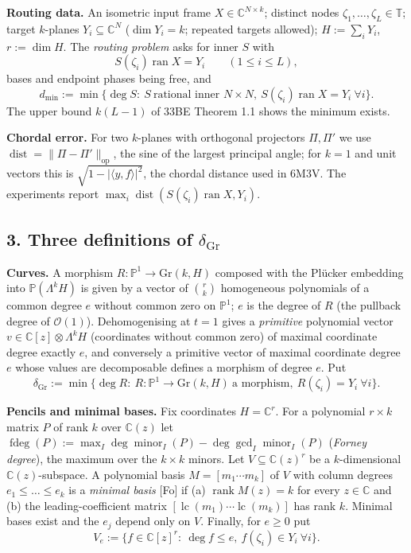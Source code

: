 \documentclass[
  11pt,
  a4paper,
]{article}
\begin{document}
\textbf{Routing data.} An isometric input frame
\(X\in\mathbb C^{N\times k}\); distinct nodes
\(\zeta_1,\allowbreak{}\dots,\allowbreak{}\zeta_L\in\mathbb T\); target \(k\)-planes
\(Y_i\subseteq\mathbb C^N\) (\(\dim Y_i=k\); repeated targets allowed);
\(H:=\sum_iY_i\), \(r:=\dim H\). The \emph{routing problem} asks for
inner \(S\) with
\[S(\zeta_i)\operatorname{ran}X=Y_i\qquad(1\le i\le L),\] bases and
endpoint phases being free, and
\[d_{\min}:=\min\{\deg S:\ S\ \text{rational inner } N\times N,\ S(\zeta_i)\operatorname{ran}X=Y_i\ \forall i\}.\]
The upper bound \(k(L-1)\) of 33BE Theorem 1.1 shows the minimum exists.

\textbf{Chordal error.} For two \(k\)-planes with orthogonal projectors
\(\Pi,\allowbreak{}\Pi'\) we use \(\operatorname{dist}=\|\Pi-\Pi'\|_{\mathrm{op}}\),
the sine of the largest principal angle; for \(k=1\) and unit vectors
this is \(\sqrt{1-|\langle y,\allowbreak{}f\rangle|^2}\), the chordal distance used
in 6M3V. The experiments report
\(\max_i\operatorname{dist}(S(\zeta_i)\operatorname{ran}X,\allowbreak{}Y_i)\).

\subsection{\texorpdfstring{3. Three definitions of
\(\delta_{\mathrm{Gr}}\)}{3. Three definitions of \textbackslash delta\_\{\textbackslash mathrm\{Gr\}\}}}\label{three-definitions-of-delta_mathrmgr}

\textbf{Curves.} A morphism \(R:\mathbb P^1\to\mathrm{Gr}(k,\allowbreak{}H)\)
composed with the Plücker embedding into \(\mathbb P(\Lambda^kH)\) is
given by a vector of \(\binom rk\) homogeneous polynomials of a common
degree \(e\) without common zero on \(\mathbb P^1\); \(e\) is the degree
of \(R\) (the pullback degree of \(\mathcal O(1)\)). Dehomogenising at
\(t=1\) gives a \emph{primitive} polynomial vector
\(v\in\mathbb C[z]\otimes\Lambda^kH\) (coordinates without common zero)
of maximal coordinate degree exactly \(e\), and conversely a primitive
vector of maximal coordinate degree \(e\) whose values are decomposable
defines a morphism of degree \(e\). Put
\[\delta_{\mathrm{Gr}}:=\min\{\deg R:\ R:\mathbb P^1\to\mathrm{Gr}(k,H)\ \text{a morphism},\ R(\zeta_i)=Y_i\ \forall i\}.\]

\textbf{Pencils and minimal bases.} Fix coordinates \(H=\mathbb C^r\).
For a polynomial \(r\times k\) matrix \(P\) of rank \(k\) over
\(\mathbb C(z)\) let
\(\operatorname{fdeg}(P):=\max_I\deg\operatorname{minor}_I(P)-\deg\gcd_I\operatorname{minor}_I(P)\)
(\emph{Forney degree}), the maximum over the \(k\times k\) minors. Let
\(V\subseteq\mathbb C(z)^r\) be a \(k\)-dimensional
\(\mathbb C(z)\)-subspace. A polynomial basis \(M=[m_1\cdots m_k]\) of
\(V\) with column degrees \(e_1\le\dots\le e_k\) is a \emph{minimal
basis} {[}Fo{]} if (a) \(\operatorname{rank}M(z)=k\) for every
\(z\in\mathbb C\) and (b) the leading-coefficient matrix
\([\operatorname{lc}(m_1)\cdots\operatorname{lc}(m_k)]\) has rank \(k\).
Minimal bases exist and the \(e_j\) depend only on \(V\). Finally, for
\(e\ge0\) put
\[V_e:=\{f\in\mathbb C[z]^r:\ \deg f\le e,\ f(\zeta_i)\in Y_i\ \forall i\}.\]
\end{document}

